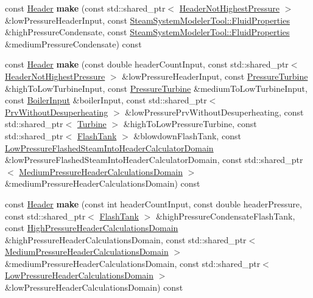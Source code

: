 \begin{DoxyCompactItemize}
const \hyperlink{class_header}{Header} {\bfseries make} (const std\+::shared\+\_\+ptr$<$ \hyperlink{class_header_not_highest_pressure}{Header\+Not\+Highest\+Pressure} $>$ \&low\+Pressure\+Header\+Input, const \hyperlink{struct_steam_system_modeler_tool_1_1_fluid_properties}{Steam\+System\+Modeler\+Tool\+::\+Fluid\+Properties} \&high\+Pressure\+Condensate, const \hyperlink{struct_steam_system_modeler_tool_1_1_fluid_properties}{Steam\+System\+Modeler\+Tool\+::\+Fluid\+Properties} \&medium\+Pressure\+Condensate) const
\item 
\mbox{\label{class_header_factory_ad931f2f01ecb84905f083bbbab8324f2}} 
const \hyperlink{class_header}{Header} {\bfseries make} (const double header\+Count\+Input, const std\+::shared\+\_\+ptr$<$ \hyperlink{class_header_not_highest_pressure}{Header\+Not\+Highest\+Pressure} $>$ \&low\+Pressure\+Header\+Input, const \hyperlink{class_pressure_turbine}{Pressure\+Turbine} \&high\+To\+Low\+Turbine\+Input, const \hyperlink{class_pressure_turbine}{Pressure\+Turbine} \&medium\+To\+Low\+Turbine\+Input, const \hyperlink{class_boiler_input}{Boiler\+Input} \&boiler\+Input, const std\+::shared\+\_\+ptr$<$ \hyperlink{class_prv_without_desuperheating}{Prv\+Without\+Desuperheating} $>$ \&low\+Pressure\+Prv\+Without\+Desuperheating, const std\+::shared\+\_\+ptr$<$ \hyperlink{class_turbine}{Turbine} $>$ \&high\+To\+Low\+Pressure\+Turbine, const std\+::shared\+\_\+ptr$<$ \hyperlink{class_flash_tank}{Flash\+Tank} $>$ \&blowdown\+Flash\+Tank, const \hyperlink{class_low_pressure_flashed_steam_into_header_calculator_domain}{Low\+Pressure\+Flashed\+Steam\+Into\+Header\+Calculator\+Domain} \&low\+Pressure\+Flashed\+Steam\+Into\+Header\+Calculator\+Domain, const std\+::shared\+\_\+ptr$<$ \hyperlink{class_medium_pressure_header_calculations_domain}{Medium\+Pressure\+Header\+Calculations\+Domain} $>$ \&medium\+Pressure\+Header\+Calculations\+Domain) const
\item 
\mbox{\label{class_header_factory_acd1afb01f528d0113f3885ddb6097aa7}} 
const \hyperlink{class_header}{Header} {\bfseries make} (const int header\+Count\+Input, const double header\+Pressure, const std\+::shared\+\_\+ptr$<$ \hyperlink{class_flash_tank}{Flash\+Tank} $>$ \&high\+Pressure\+Condensate\+Flash\+Tank, const \hyperlink{class_high_pressure_header_calculations_domain}{High\+Pressure\+Header\+Calculations\+Domain} \&high\+Pressure\+Header\+Calculations\+Domain, const std\+::shared\+\_\+ptr$<$ \hyperlink{class_medium_pressure_header_calculations_domain}{Medium\+Pressure\+Header\+Calculations\+Domain} $>$ \&medium\+Pressure\+Header\+Calculations\+Domain, const std\+::shared\+\_\+ptr$<$ \hyperlink{class_low_pressure_header_calculations_domain}{Low\+Pressure\+Header\+Calculations\+Domain} $>$ \&low\+Pressure\+Header\+Calculations\+Domain) const

\end{DoxyCompactItemize}
